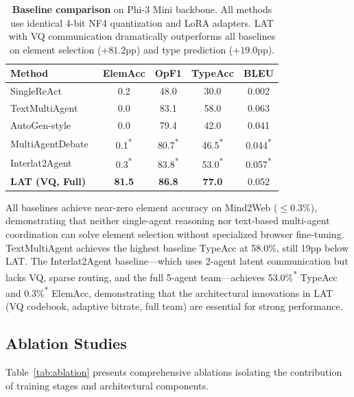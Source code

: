 \documentclass{article}
\newcommand{\best}[1]{\textbf{#1}}
\newcommand{\tbd}[1]{#1\textsuperscript{*}}
\newcommand{\ours}{\textsc{LAT}}
\begin{document}
\begin{table}[t]
\centering
\caption{\textbf{Baseline comparison} on Phi-3 Mini backbone.  All methods use identical 4-bit NF4 quantization and LoRA adapters.  \ours{} with VQ communication dramatically outperforms all baselines on element selection ($+81.2$pp) and type prediction ($+19.0$pp).}
\label{tab:baselines}
\small
\begin{tabular}{lcccc}
\toprule
\textbf{Method} & \textbf{ElemAcc} & \textbf{OpF1} & \textbf{TypeAcc} & \textbf{BLEU} \\
\midrule
SingleReAct~\cite{yao2023react} & 0.2 & 48.0 & 30.0 & 0.002 \\
TextMultiAgent & 0.0 & 83.1 & 58.0 & 0.063 \\
AutoGen-style~\cite{wu2023autogen} & 0.0 & 79.4 & 42.0 & 0.041 \\
MultiAgentDebate~\cite{du2023improving} & \tbd{0.1} & \tbd{80.7} & \tbd{46.5} & \tbd{0.044} \\
Interlat2Agent & \tbd{0.3} & \tbd{83.8} & \tbd{53.0} & \tbd{0.057} \\
\midrule
\textbf{\ours{} (VQ, Full)} & \best{81.5} & \best{86.8} & \best{77.0} & 0.052 \\
\bottomrule
\end{tabular}
\end{table}

All baselines achieve near-zero element accuracy on Mind2Web ($\leq$0.3\%), demonstrating that neither single-agent reasoning nor text-based multi-agent coordination can solve element selection without specialized browser fine-tuning.
TextMultiAgent achieves the highest baseline TypeAcc at 58.0\%, still 19pp below \ours{}.
The Interlat2Agent baseline---which uses 2-agent latent communication but lacks VQ, sparse routing, and the full 5-agent team---achieves \tbd{53.0\%} TypeAcc and \tbd{0.3\%} ElemAcc, demonstrating that the architectural innovations in \ours{} (VQ codebook, adaptive bitrate, full team) are essential for strong performance.


\subsection{Ablation Studies}

Table~\ref{tab:ablation} presents comprehensive ablations isolating the contribution of training stages and architectural components.
\end{document}

